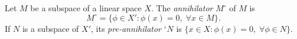 Let $M$ be a subspace of a linear space $X$. The \emph{annihilator} $M^\circ$ of $M$ is $$M^\circ = \{\phi \in X' : \phi(x) = 0,\; \forall x \in M\}.$$ If $N$ is a subspace of $X'$, its \emph{pre-annihilator} $^\circ N$ is $\{x \in X : \phi(x) = 0,\; \forall \phi \in N\}$.
